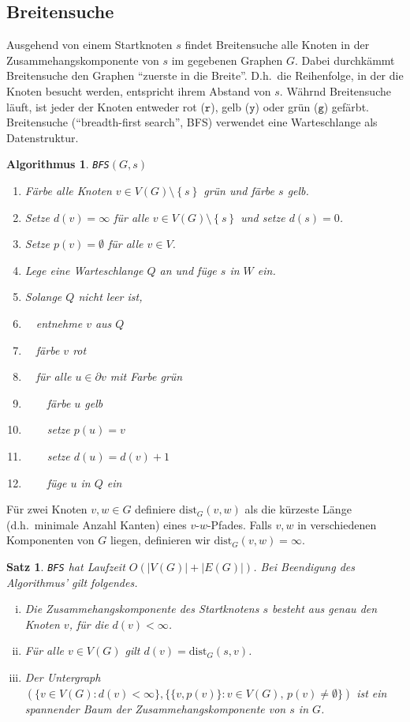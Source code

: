 \documentclass[10pt,reqno]{amsart}
\numberwithin{equation}{section}
\newcommand\nix{\,\cdot\,}
\newtheorem{theorem}[definition]{Satz}
\newtheorem{algorithm}[definition]{Algorithmus}
\newcommand\dist{\mathrm{dist}}
\newcommand\cbc[1]{\left\{{#1}\right\}}
\begin{document}
\subsection{Breitensuche}\label{sec_bfs}
Ausgehend von einem Startknoten $s$ findet Breitensuche alle Knoten in der Zusammehangskomponente von $s$ im gegebenen Graphen $G$.
Dabei durchk\"ammt Breitensuche den Graphen ``zuerste in die Breite''.
D.h.\ die Reihenfolge, in der die Knoten besucht werden, entspricht ihrem Abstand von $s$.
W\"ahrnd Breitensuche l\"auft, ist jeder der Knoten entweder rot ($\mathtt r$), gelb ($\mathtt y$) oder gr\"un ($\mathtt g$) gef\"arbt.
Breitensuche (``breadth-first search'', BFS) verwendet eine Warteschlange als Datenstruktur.

\begin{algorithm}{\tt BFS}$(G,s)$
	\begin{enumerate}
		\item F\"arbe alle Knoten $v\in V(G)\setminus\cbc s$ gr\"un und f\"arbe $s$ gelb.
		\item Setze $d(v)=\infty$ f\"ur alle $v\in V(G)\setminus\cbc s$ und setze $d(s)=0$.
		\item Setze $p(v)=\emptyset$ f\"ur alle $v\in V$.
		\item Lege eine Warteschlange $Q$ an und f\"uge $s$ in $W$ ein.
		\item Solange $Q$ nicht leer ist,
		\item $\quad$entnehme $v$ aus $Q$
		\item $\quad$f\"arbe $v$ rot
		\item $\quad$f\"ur alle $u\in\partial v$ mit Farbe gr\"un
		\item $\quad\quad$f\"arbe $u$ gelb
		\item $\quad\quad$setze $p(u)=v$
		\item $\quad\quad$setze $d(u)=d(v)+1$
		\item $\quad\quad$f\"uge $u$ in $Q$ ein
	\end{enumerate}
\end{algorithm}

F\"ur zwei Knoten $v,w\in G$ definiere $\dist_G(v,w)$ als die k\"urzeste L\"ange (d.h.\ minimale Anzahl Kanten) eines $v$-$w$-Pfades.
Falls $v,w$ in verschiedenen Komponenten von $G$ liegen, definieren wir $\dist_G(v,w)=\infty$.

\begin{theorem}\label{Thm_BFS}
	{\tt BFS} hat Laufzeit $O(|V(G)|+|E(G)|)$.
	Bei Beendigung des Algorithmus' gilt folgendes.
	\begin{enumerate}[(i)]
		\item Die Zusammehangskomponente des Startknotens $s$ besteht aus genau den Knoten $v$, f\"ur die $d(v)<\infty$.
		\item F\"ur alle $v\in V(G)$ gilt $d(v)=\dist_G(s,v)$.
		\item Der Untergraph $(\{v\in V(G):d(v)<\infty\},\{\{v,p(v)\}:v\in V(G),\,p(v)\neq\emptyset\})$ ist ein spannender Baum der Zusammehangskomponente von $s$ in $G$.
	\end{enumerate}
\end{theorem}
\end{document}
